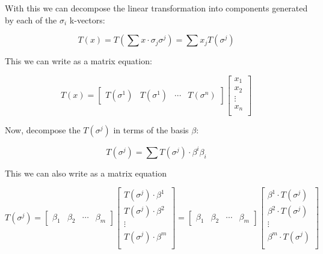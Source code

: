 \documentclass{article}      %
\begin{document}
With this we can decompose the linear transformation into components generated by each of the $\sigma_i$ k-vectors:

\begin{equation}
T(x) = T(\sum x \cdot \sigma_j \sigma^j) = \sum x_j T(\sigma^j)
\end{equation}

This we can write as a matrix equation:

\begin{equation}
T(x) = 
\begin{bmatrix}
T(\sigma^1) & T(\sigma^1) & \cdots & T(\sigma^n)
\end{bmatrix}
\begin{bmatrix}
x_1 \\
x_2 \\
\vdots \\
x_n \\
\end{bmatrix}
\end{equation}

Now, decompose the $T(\sigma^j)$ in terms of the basis $\beta$:

\begin{equation}
T(\sigma^j) = \sum T(\sigma^j) \cdot \beta^i \beta_i
\end{equation}

This we can also write as a matrix equation

\begin{equation}
T(\sigma^j) = 
\begin{bmatrix}
\beta_1 & \beta_2 & \cdots & \beta_m
\end{bmatrix}
\begin{bmatrix}
T(\sigma^j) \cdot \beta^1 \\
T(\sigma^j) \cdot \beta^2 \\
\vdots \\
T(\sigma^j) \cdot \beta^m \\
\end{bmatrix}
=
\begin{bmatrix}
\beta_1 & \beta_2 & \cdots & \beta_m
\end{bmatrix}
\begin{bmatrix}
\beta^1 \cdot T(\sigma^j) \\
\beta^2 \cdot T(\sigma^j) \\
\vdots \\
\beta^m \cdot T(\sigma^j) \\
\end{bmatrix}
\end{equation}
\end{document}
